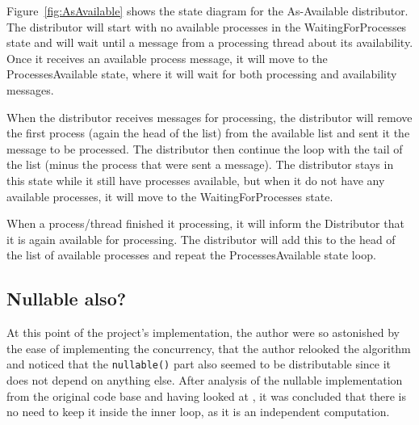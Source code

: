 \documentclass[a4paper,11pt]{report}
\begin{document}
Figure~\ref{fig:AsAvailable} shows the state diagram for the
As-Available distributor. The distributor will start with no available
processes in the WaitingForProcesses state and will wait until a
message from a processing thread about its availability. Once it receives
an available process message, it will move to the ProcessesAvailable
state, where it will wait for both processing and availability messages.

When the distributor receives messages for processing, the distributor
will remove the first process (again the head of the list) from the
available list and sent it the message to be processed. The
distributor then continue the loop with the tail of the list (minus
the process that were sent a message). The distributor stays in this
state while it still have processes available, but when it do not have
any available processes, it will move to the WaitingForProcesses
state.
 
When a process/thread finished it processing, it will inform the
Distributor that it is again available for processing. The distributor
will add this to the head of the list of available processes and
repeat the ProcessesAvailable state loop.


\subsection{Nullable also?}

At this point of the project's implementation, the author were so
astonished by the ease of implementing the concurrency, that the
author relooked the algorithm and noticed that the \texttt{nullable()}
part also seemed to be distributable since it does not depend on
anything else.  After analysis of the nullable implementation from the
original code base and having looked at \cite{watson1995taxonomies},
it was concluded that there is no need to keep it inside the
inner loop, as it is an independent computation.
\end{document}

